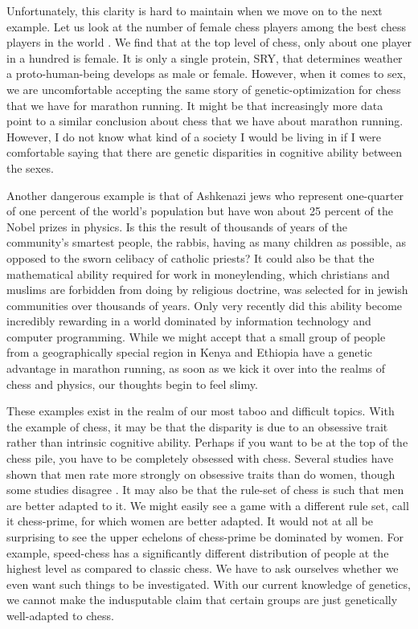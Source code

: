 Unfortunately, this clarity is hard to maintain when we move on to the next example.
Let us look at the number of female chess players among the best chess players in the world \cite{chess2020}.
We find that at the top level of chess, only about one player in a hundred is female.
It is only a single protein, SRY, that determines weather a proto-human-being develops as male or female.
However, when it comes to sex, we are uncomfortable accepting the same story of genetic-optimization for chess that we have for marathon running.
It might be that increasingly more data point to a similar conclusion about chess that we have about marathon running.
However, I do not know what kind of a society I would be living in if I were comfortable saying that there are genetic disparities in cognitive ability between the sexes.

Another dangerous example is that of Ashkenazi jews who represent one-quarter of one percent of the world's population but have won about 25 percent of the Nobel prizes in physics.
Is this the result of thousands of years of the community's smartest people, the rabbis, having as many children as possible, as opposed to the sworn celibacy of catholic priests?
It could also be that the mathematical ability required for work in moneylending, which christians and muslims are forbidden from doing by religious doctrine, was selected for in jewish communities over thousands of years.
Only very recently did this ability become incredibly rewarding in a world dominated by information technology and computer programming.
While we might accept that a small group of people from a geographically special region in Kenya and Ethiopia have a genetic advantage in marathon running, as soon as we kick it over into the realms of chess and physics, our thoughts begin to feel slimy.

These examples exist in the realm of our most taboo and difficult topics.
With the example of chess, it may be that the disparity is due to an obsessive trait rather than intrinsic cognitive ability.
Perhaps if you want to be at the top of the chess pile, you have to be completely obsessed with chess.
Several studies have shown that men rate more strongly on obsessive traits than do women, though some studies disagree \cite{Mathis2011}.
It may also be that the rule-set of chess is such that men are better adapted to it.
We might easily see a game with a different rule set, call it chess-prime, for which women are better adapted.
It would not at all be surprising to see the upper echelons of chess-prime be dominated by women.
For example, speed-chess has a significantly different distribution of people at the highest level as compared to classic chess.
We have to ask ourselves whether we even want such things to be investigated.
With our current knowledge of genetics, we cannot make the indusputable claim that certain groups are just genetically well-adapted to chess.

